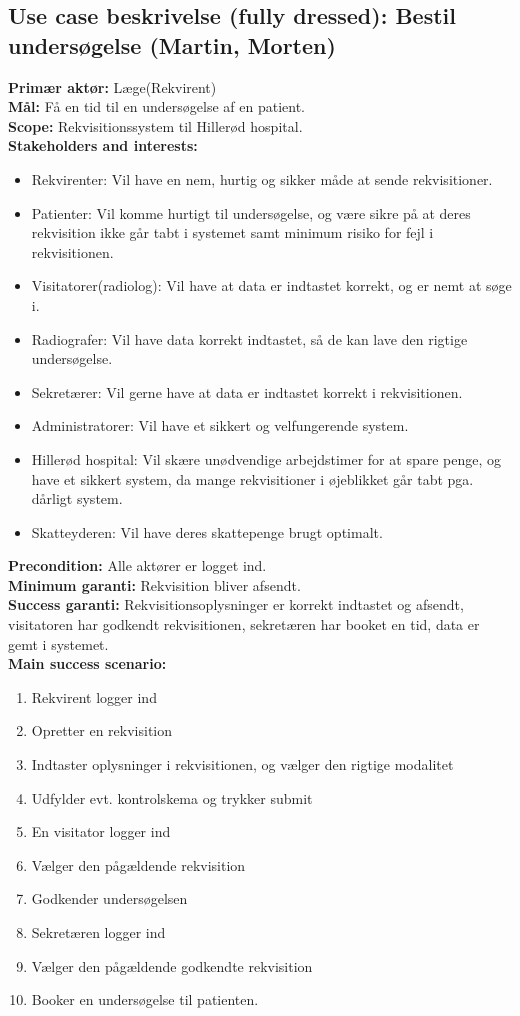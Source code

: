 \subsection*{Use case beskrivelse (fully dressed): Bestil
undersøgelse\cite{cockburn} (Martin, Morten)}
\textbf{Primær aktør:} Læge(Rekvirent)\\
\textbf{Mål:} Få en tid til en undersøgelse af en patient.\\
\textbf{Scope:} Rekvisitionssystem til Hillerød hospital.\\
\textbf{Stakeholders and interests:}
\begin{itemize}
  \item Rekvirenter: Vil have en nem, hurtig og sikker måde at sende
  rekvisitioner.
  \item Patienter: Vil komme hurtigt til undersøgelse, og være sikre på at deres
  rekvisition ikke går tabt i systemet samt minimum risiko for fejl i rekvisitionen.
  \item Visitatorer(radiolog): Vil have at data er indtastet korrekt, og er nemt
  at søge i.
  \item Radiografer: Vil have data korrekt indtastet, så de kan lave den rigtige
  undersøgelse.
  \item Sekretærer: Vil gerne have at data er indtastet korrekt i rekvisitionen.
  \item Administratorer: Vil have et sikkert og velfungerende system.
  \item Hillerød hospital: Vil skære unødvendige arbejdstimer for at spare
  penge, og have et sikkert system, da mange rekvisitioner i øjeblikket går tabt
  pga. dårligt system.
  \item Skatteyderen: Vil have deres skattepenge brugt optimalt.
\end{itemize}
\textbf{Precondition:} Alle aktører er logget ind.\\
\textbf{Minimum garanti:} Rekvisition bliver afsendt.\\
\textbf{Success garanti:} Rekvisitionsoplysninger er korrekt indtastet og
afsendt, visitatoren har godkendt rekvisitionen, sekretæren har booket en tid,
data er gemt i systemet.\\
\textbf{Main success scenario:}
\begin{enumerate}
  \item Rekvirent logger ind
  \item Opretter en rekvisition
  \item Indtaster oplysninger i rekvisitionen, og vælger den rigtige modalitet
  \item Udfylder evt. kontrolskema og trykker submit
  \item En visitator logger ind
  \item Vælger den pågældende rekvisition
  \item Godkender undersøgelsen
  \item Sekretæren logger ind
  \item Vælger den pågældende godkendte rekvisition
  \item Booker en undersøgelse til patienten.
\end{enumerate}
